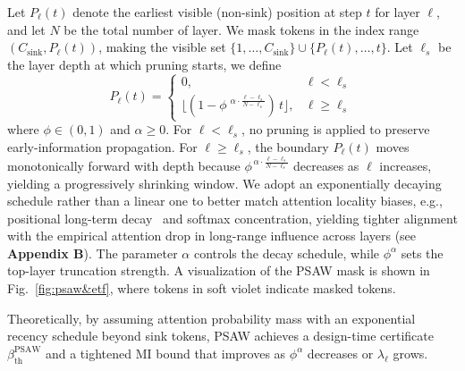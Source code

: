 Let $P_{\ell}(t)$ denote the earliest visible (non-sink) position at step $t$ for layer $\ell$, and let $N$ be the total number of layer. We mask tokens in the index range $(C_{\text{sink}},P_{\ell}(t))$, making the visible set $\{1,\ldots, C_{\text{sink}}\}\cup \{P_{\ell}(t),\ldots,t\}$. Let $\ell_s$ be the layer depth at which pruning starts, we define
\begin{equation}
\label{eq:psaw}
P_\ell(t)=
\begin{cases}
0, &\ell < \ell_s
\\
\big\lfloor (1 \!-\!\phi\;^{\alpha\cdot\frac{\ell-\ell_s}{N-\ell_s}}) \, t \big\rfloor, &\ell \ge \ell_s
\end{cases}
\end{equation}
where $\phi\!\in\!(0,1)$ and $\alpha\!\ge\!0$. For $\ell\!<\!\ell_s$, no pruning is applied to preserve early-information propagation. For $\ell \!\ge\! \ell_s$, the boundary $P_\ell(t)$ moves monotonically forward with depth because $\phi^{\,\alpha\cdot\frac{\ell-\ell_s}{N-\ell_s}}$ decreases as $\ell$ increases, yielding a progressively shrinking window. We adopt an exponentially decaying schedule rather than a linear one to better match attention locality biases, e.g., positional long-term decay~\cite{su2024roformer} and softmax concentration, yielding tighter alignment with the empirical attention drop in long-range influence across layers (see \textbf{Appendix B}). The parameter $\alpha$ controls the decay schedule, while $\phi^\alpha$ sets the top-layer truncation strength. A visualization of the PSAW mask is shown in Fig.~\ref{fig:psaw&etf}, where \textcolor{PSAW}{tokens in soft violet} indicate masked tokens. 

Theoretically, by assuming attention probability mass with an exponential recency schedule beyond sink tokens, PSAW achieves a design-time certificate $\beta_{\mathrm{th}}^{\mathrm{PSAW}}$ and a tightened MI bound that improves as $\phi^\alpha$ decreases or $\lambda_\ell$ grows.



